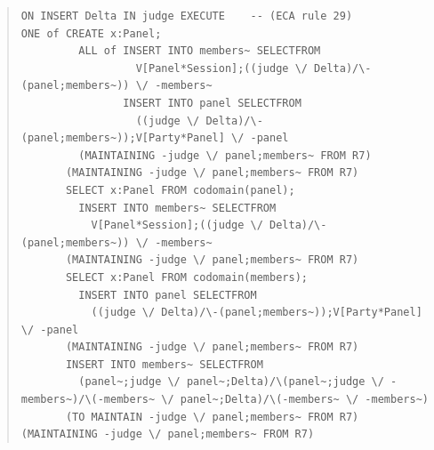 \documentclass[10pt,a4paper]{report}              %
\theoremstyle{plain}\theorembodyfont{\rmfamily}\newtheorem{definition}{Definition}[section]
\theoremstyle{plain}\theorembodyfont{\rmfamily}\newtheorem{designrule}[definition]{Requirement}
\begin{document}
\begin{quote}
\begin{verbatim}
ON INSERT Delta IN judge EXECUTE    -- (ECA rule 29)
ONE of CREATE x:Panel;
         ALL of INSERT INTO members~ SELECTFROM
                  V[Panel*Session];((judge \/ Delta)/\-(panel;members~)) \/ -members~
                INSERT INTO panel SELECTFROM
                  ((judge \/ Delta)/\-(panel;members~));V[Party*Panel] \/ -panel
         (MAINTAINING -judge \/ panel;members~ FROM R7)
       (MAINTAINING -judge \/ panel;members~ FROM R7)
       SELECT x:Panel FROM codomain(panel);
         INSERT INTO members~ SELECTFROM
           V[Panel*Session];((judge \/ Delta)/\-(panel;members~)) \/ -members~
       (MAINTAINING -judge \/ panel;members~ FROM R7)
       SELECT x:Panel FROM codomain(members);
         INSERT INTO panel SELECTFROM
           ((judge \/ Delta)/\-(panel;members~));V[Party*Panel] \/ -panel
       (MAINTAINING -judge \/ panel;members~ FROM R7)
       INSERT INTO members~ SELECTFROM
         (panel~;judge \/ panel~;Delta)/\(panel~;judge \/ -members~)/\(-members~ \/ panel~;Delta)/\(-members~ \/ -members~)
       (TO MAINTAIN -judge \/ panel;members~ FROM R7)
(MAINTAINING -judge \/ panel;members~ FROM R7)
\end{verbatim}
\end{quote}
\end{document}
